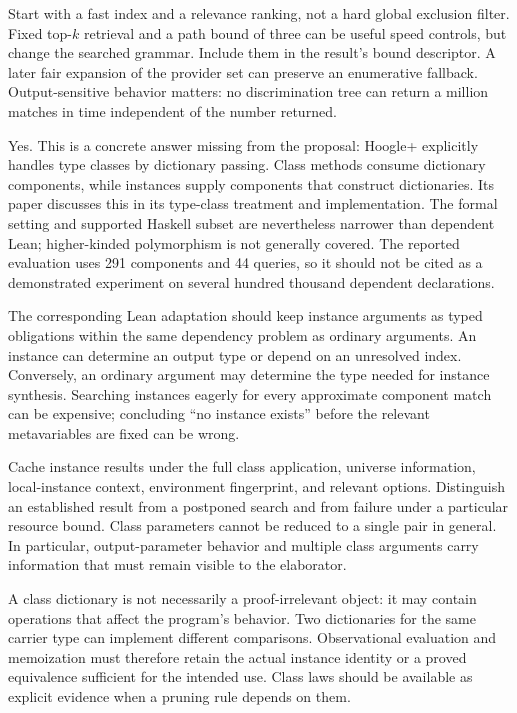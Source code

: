 Start with a fast index and a relevance ranking, not a hard global exclusion filter. Fixed top-$k$ retrieval and a path bound of three can be useful speed controls, but change the searched grammar. Include them in the result's bound descriptor. A later fair expansion of the provider set can preserve an enumerative fallback. Output-sensitive behavior matters: no discrimination tree can return a million matches in time independent of the number returned.\cite{proposal,hoogle}


\answer Yes. This is a concrete answer missing from the proposal: Hoogle+ explicitly handles type classes by dictionary passing. Class methods consume dictionary components, while instances supply components that construct dictionaries. Its paper discusses this in its type-class treatment and implementation. The formal setting and supported Haskell subset are nevertheless narrower than dependent Lean; higher-kinded polymorphism is not generally covered. The reported evaluation uses 291 components and 44 queries, so it should not be cited as a demonstrated experiment on several hundred thousand dependent declarations.\cite{hoogle}

The corresponding Lean adaptation should keep instance arguments as typed obligations within the same dependency problem as ordinary arguments. An instance can determine an output type or depend on an unresolved index. Conversely, an ordinary argument may determine the type needed for instance synthesis. Searching instances eagerly for every approximate component match can be expensive; concluding ``no instance exists'' before the relevant metavariables are fixed can be wrong.

Cache instance results under the full class application, universe information, local-instance context, environment fingerprint, and relevant options. Distinguish an established result from a postponed search and from failure under a particular resource bound. Class parameters cannot be reduced to a single  pair in general. In particular, output-parameter behavior and multiple class arguments carry information that must remain visible to the elaborator.

A class dictionary is not necessarily a proof-irrelevant object: it may contain operations that affect the program's behavior. Two dictionaries for the same carrier type can implement different comparisons. Observational evaluation and memoization must therefore retain the actual instance identity or a proved equivalence sufficient for the intended use. Class laws should be available as explicit evidence when a pruning rule depends on them.


